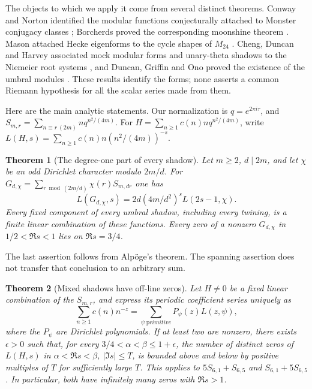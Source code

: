 \documentclass[11pt]{amsart}
\newtheorem{theorem}{Theorem}[section]
\theoremstyle{definition}
\theoremstyle{remark}
\newcommand{\nm}{\mathrm}
\begin{document}
The objects to which we apply it come from several distinct theorems.
Conway and Norton identified the modular functions conjecturally attached
to Monster conjugacy classes \cite[Sect.~2 and Table~2]{CN1979}; Borcherds
proved the corresponding moonshine theorem \cite[Theorem~1.1]{Borcherds1992}.
Mason attached Hecke eigenforms to the cycle shapes of $M_{24}$
\cite{Mason1985}. Cheng, Duncan and Harvey associated mock modular forms
and unary-theta shadows to the Niemeier root systems \cite{CDH2014}, and
Duncan, Griffin and Ono proved the existence of the umbral modules
\cite[Theorem~1.1]{DGO2015}. These results identify the forms; none asserts
a common Riemann hypothesis for all the scalar series made from them.

Here are the main analytic statements. Our normalization is
$q=e^{2\pi i\tau}$, and
$S_{m,r}=\sum_{n\equiv r\ (2m)}nq^{n^2/(4m)}$.
For $H=\sum_{n\geq1}c(n)nq^{n^2/(4m)}$, write
$L(H,s)=\sum_{n\geq1}c(n)n(n^2/(4m))^{-s}$.

\begin{theorem}[The degree-one part of every shadow]\label{thm:intro-dirichlet}
Let $m\geq2$, $d\mid2m$, and let $\chi$ be an odd Dirichlet character
modulo $2m/d$. For
$G_{d,\chi}=\sum_{r\bmod(2m/d)}\chi(r)S_{m,dr}$ one has
\[
 L(G_{d,\chi},s)=2d(4m/d^2)^sL(2s-1,\chi).
\]
Every fixed component of every umbral shadow, including every twining,
is a finite linear combination of these functions. Every zero of a
nonzero $G_{d,\chi}$ in $1/2<\Re s<1$ lies on $\Re s=3/4$.
\end{theorem}

The last assertion follows from Alp\"oge's theorem. The spanning
assertion does not transfer that conclusion to an arbitrary sum.

\begin{theorem}[Mixed shadows have off-line zeros]\label{thm:intro-mixed}
Let $H\ne0$ be a fixed linear combination of the $S_{m,r}$, and express
its periodic coefficient series uniquely as
\[
 \sum_{n\geq1}c(n)n^{-z}=\sum_{\psi\ {\nm primitive}}P_\psi(z)L(z,\psi),
\]
where the $P_\psi$ are Dirichlet polynomials. If at least two are nonzero,
there exists $\epsilon>0$ such that, for every
$3/4<\alpha<\beta\leq1+\epsilon$, the number of distinct zeros of
$L(H,s)$ in $\alpha<\Re s<\beta$, $|\Im s|\leq T$, is bounded above
and below by positive multiples of $T$ for sufficiently large $T$.
This applies to $5S_{6,1}+S_{6,5}$ and $S_{6,1}+5S_{6,5}$.
In particular, both have infinitely many zeros with $\Re s>1$.
\end{theorem}
\end{document}
